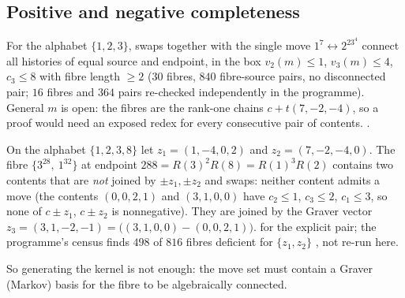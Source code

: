 \subsection{Positive and negative completeness}
\begin{proposition}\label{prop:T6c}
For the alphabet $\{1,2,3\}$, swaps together with the single move $1^7\leftrightarrow2^23^4$ connect all histories of equal source and endpoint, in the box $v_2(m)\le1$, $v_3(m)\le4$, $c_3\le8$ with fibre length $\ge2$ ($30$ fibres, $840$ fibre-source pairs, no disconnected pair; $16$ fibres and $364$ pairs re-checked independently in the programme). General $m$ is open: the fibres are the rank-one chains $c+t(7,-2,-4)$, so a proof would need an exposed redex for every consecutive pair of contents. .
\end{proposition}
\begin{proposition}\label{prop:graver}
On the alphabet $\{1,2,3,8\}$ let $z_1=(1,-4,0,2)$ and $z_2=(7,-2,-4,0)$. The fibre $\{3^28,\ 1^32\}$ at endpoint $288=R(3)^2R(8)=R(1)^3R(2)$ contains two contents that are \emph{not} joined by $\pm z_1,\pm z_2$ and swaps: neither content admits a move (the contents $(0,0,2,1)$ and $(3,1,0,0)$ have $c_2\le1$, $c_3\le2$, $c_1\le3$, so none of $c\pm z_1$, $c\pm z_2$ is nonnegative). They are joined by the Graver vector $z_3=(3,1,-2,-1)=\bigl((3,1,0,0)-(0,0,2,1)\bigr)$.  for the explicit pair; the programme's census finds $498$ of $816$ fibres deficient for $\{z_1,z_2\}$ , not re-run here.
\end{proposition}
So generating the kernel is not enough: the move set must contain a Graver (Markov) basis for the fibre to be algebraically connected.

